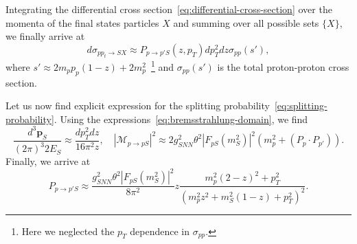 \documentclass[a4paper,12pt,dvipsnames,usernames]{article}
\begin{document}
Integrating the differential cross section~\eqref{eq:differential-cross-section} over the momenta of the final states particles $X$ and summing over all possible sets $\{X\}$, we finally arrive at
\begin{equation}
    d\sigma_{pp_{t}\to SX} \approx P_{p\to p'S}(z,p_{T})dp_{T}^{2}dz\sigma_{pp}(s'),
\end{equation}
where $s' \approx 2m_{p}p_{p}(1-z)+2m_{p}^{2}$~\footnote{Here we neglected the $p_{T}$ dependence in $\sigma_{pp}$.} and $\sigma_{pp}(s')$ is the total proton-proton cross section.

Let us now find explicit expression for the splitting probability~\eqref{eq:splitting-probability}. Using the expressions~\eqref{eq:bremsstrahlung-domain}, we find 
\begin{equation}
\frac{d^{3}\bm{p}_{S}}{(2\pi)^{3}2E_{S}} \approx \frac{dp_{T}^{2}dz}{16 \pi^{2}z}, \quad 
|\mathcal{M}_{p\to pS}|^{2} \approx 2g_{SNN}^{2}\theta^{2}|F_{pS}(m_{S}^{2})|^{2}(m_{p}^{2}+(P_{p}\cdot P_{p'})).
\end{equation}
Finally, we arrive at
\begin{equation}
P_{p\to p'S} \approx \frac{g_{SNN}^{2}\theta^{2}|F_{pS}(m_{S}^{2})|^{2}}{8\pi^{2}}z\frac{m_{p}^{2}(2-z)^{2}+p_{T}^{2}}{(m_{p}^{2}z^{2}+m_{S}^{2}(1-z)+p_{T}^{2})^{2}}.
\end{equation}
\end{document}
